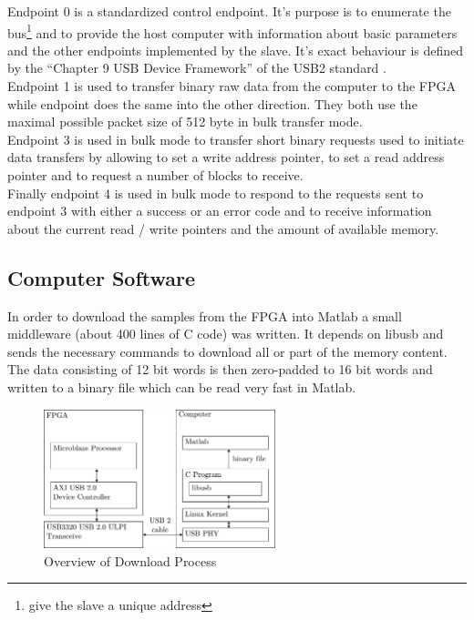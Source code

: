 Endpoint 0 is a standardized control endpoint. It's purpose is to
enumerate the bus\footnote{give the slave a unique address} and to provide the
host computer with information about basic parameters and the other endpoints
implemented by the slave. It's exact behaviour is defined by the
``Chapter 9 USB Device Framework'' of the \gls{USB}2 standard . \\

Endpoint 1 is used to transfer binary raw data from the computer to the \gls{FPGA}
while endpoint does the same into the other direction. They both use the maximal
possible packet size of 512 byte in bulk transfer mode. \\

Endpoint 3 is used in bulk mode to transfer short binary requests used to
initiate data transfers by allowing to set a write address pointer,
to set a read address pointer and to request a number of blocks to receive. \\

Finally endpoint 4 is used in bulk mode to respond to the requests sent
to endpoint 3 with either a success or an error code and to receive information
about the current read / write pointers and the amount of available memory. \\

\subsection{Computer Software}
In order to download the samples from the \gls{FPGA} into Matlab a small
middleware (about 400 lines of C code) was written.
It depends on libusb  and sends the necessary commands
to download all or part of the memory content.
The data consisting of 12 bit words is then zero-padded to 16 bit words
and written to a binary file which can be read very fast in Matlab. \\

\begin{figure}[ht]
  \centering
  \includegraphics[width=0.6\textwidth]{figures/fpga_download}
  \caption{Overview of Download Process}
  \label{fig:fpga_download}
\end{figure}

